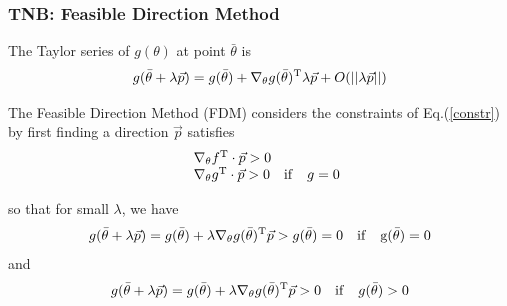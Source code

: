\documentclass[10pt,hyperref={CJKbookmarks=true},envcountsect,mathserif]{beamer}
\begin{document}
\begin{frame}
	\frametitle{TNB: Feasible Direction Method}

The Taylor series of $g(\theta)$ at point $\bar\theta$ is
\begin{equation}
    g(\bar\theta + \lambda \vec{p}) = g(\bar\theta) + \nabla_\theta g(\bar\theta)^{\rm{T}} \lambda \vec{p} + O(||\lambda \vec{p}||)
\end{equation}

The Feasible Direction Method (FDM) considers the constraints of Eq.(\ref{constr}) by first finding a direction $\vec{p}$ satisfies
\begin{equation}
\label{eq_10}
\begin{array}{ll}
    &\nabla_{\theta}f^{\rm{T}} \cdot \vec{p} >0 \quad \\
    &\nabla_{\theta}g^{\rm{T}} \cdot \vec{p} >0 \quad \mathrm{if}  \quad g = 0
\end{array}
\end{equation}

so that for small $\lambda$, we have
\begin{equation}
    g(\bar\theta + \lambda \vec{p}) = g(\bar\theta) + \lambda\nabla_\theta g(\bar\theta)^{\rm{T}}  \vec{p} > g(\bar\theta)=0 \quad \rm{if} \quad g(\bar\theta) = 0
\end{equation}
and 
\begin{equation}
    g(\bar\theta + \lambda \vec{p}) = g(\bar\theta) + \lambda\nabla_\theta g(\bar\theta)^{\rm{T}} \vec{p} > 0 \quad \mathrm{if} \quad g(\bar\theta) > 0
\end{equation}


\end{frame}
\end{document}
